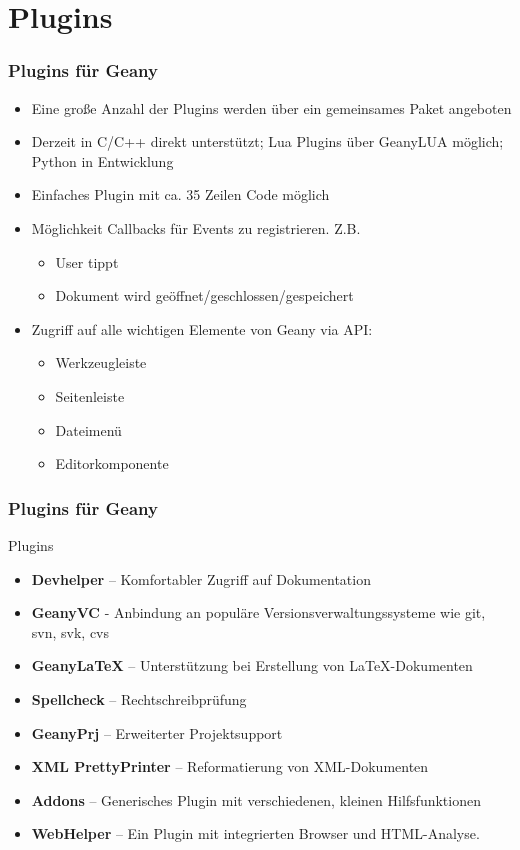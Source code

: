 \section{Plugins}
\begin{frame}
  \frametitle{Plugins für Geany}
  \begin{block}{}
    \begin{itemize}
    \item Eine große Anzahl der Plugins werden über ein gemeinsames
      Paket angeboten
    \item Derzeit in C/C++ direkt unterstützt; Lua Plugins über GeanyLUA
      möglich; Python in Entwicklung
    \item Einfaches Plugin mit ca. 35 Zeilen Code möglich
    \item Möglichkeit Callbacks für Events zu registrieren. Z.B.
      \begin{itemize}
        \item User tippt
        \item Dokument wird geöffnet/geschlossen/gespeichert
      \end{itemize}
    \item Zugriff auf alle wichtigen Elemente von Geany via API:
      \begin{itemize}
        \item Werkzeugleiste
        \item Seitenleiste
        \item Dateimenü
        \item Editorkomponente
      \end{itemize}
    \end{itemize}
  \end{block}
\end{frame}

\begin{frame}
  \frametitle{Plugins für Geany}
  \begin{block}{Plugins}
    \begin{itemize}
    \item \textbf{Devhelper} -- Komfortabler Zugriff auf Dokumentation
    \item \textbf{GeanyVC} - Anbindung an populäre
        Versions\-ver\-waltungs\-systeme wie git, svn, svk, cvs
    \item \textbf{GeanyLaTeX} -- Unterstützung bei Erstellung von
        \LaTeX-Dokumenten
    \item \textbf{Spellcheck} -- Rechtschreibprüfung
    \item \textbf{GeanyPrj} -- Erweiterter Projektsupport
    \item \textbf{XML PrettyPrinter} -- Reformatierung von XML-Dokumenten
    \item \textbf{Addons} -- Generisches Plugin mit verschiedenen,
          kleinen Hilfsfunktionen
    \item \textbf{WebHelper} -- Ein Plugin mit integrierten Browser
          und HTML-Analyse.
    \end{itemize}
  \end{block}
\end{frame}

